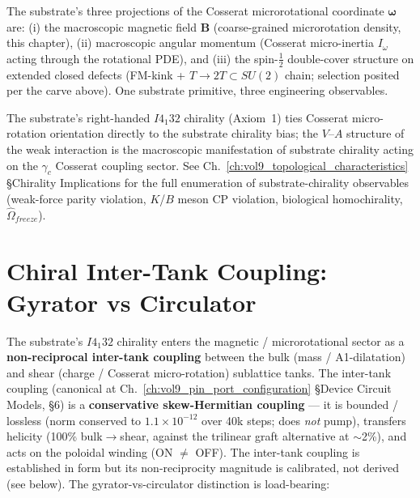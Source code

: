 The substrate's three projections of the Cosserat microrotational coordinate $\boldsymbol{\omega}$ are: (i) the macroscopic magnetic field $\mathbf{B}$ (coarse-grained microrotation density, this chapter), (ii) macroscopic angular momentum (Cosserat micro-inertia $I_\omega$ acting through the rotational PDE), and (iii) the spin-$\tfrac{1}{2}$ double-cover structure on extended closed defects (FM-kink + $T \to 2T \subset SU(2)$ chain; selection posited per the carve above). One substrate primitive, three engineering observables.

The substrate's right-handed $I4_1 32$ chirality (Axiom~1) ties Cosserat micro-rotation orientation directly to the substrate chirality bias; the $V$--$A$ structure of the weak interaction is the macroscopic manifestation of substrate chirality acting on the $\gamma_c$ Cosserat coupling sector. See Ch.~\ref{ch:vol9_topological_characteristics} \S Chirality Implications for the full enumeration of substrate-chirality observables (weak-force parity violation, $K$/$B$ meson CP violation, biological homochirality, $\hat{\Omega}_{freeze}$).

\section{Chiral Inter-Tank Coupling: Gyrator vs Circulator}
\label{sec:vol9_magnetic_forka}

The substrate's $I4_1 32$ chirality enters the magnetic / microrotational sector as a \textbf{non-reciprocal inter-tank coupling} between the bulk (mass / A1-dilatation) and shear (charge / Cosserat micro-rotation) sublattice tanks. The inter-tank coupling (canonical at Ch.~\ref{ch:vol9_pin_port_configuration} \S Device Circuit Models,  \S 6) is a \textbf{conservative skew-Hermitian coupling} --- it is bounded / lossless (norm conserved to $1.1\times10^{-12}$ over 40k steps; does \emph{not} pump), transfers helicity (100\% bulk$\to$shear, against the trilinear graft alternative at $\sim$2\%), and acts on the poloidal winding (ON $\neq$ OFF). The inter-tank coupling is established in form but its non-reciprocity magnitude is calibrated, not derived (see below). The gyrator-vs-circulator distinction is load-bearing:

